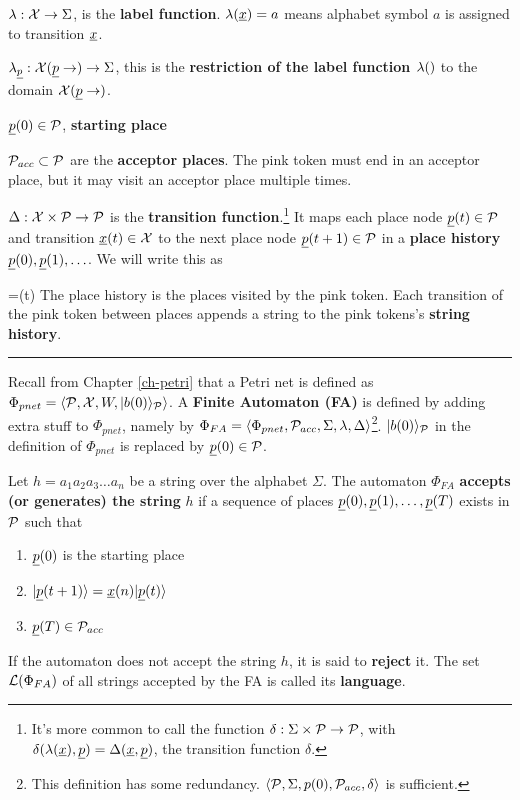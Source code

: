 $\lambda:{\cal X}\rightarrow\Sigma$, is the {\bf label function}. $\lam(\rvx)=a$ means alphabet symbol $a$ is assigned to transition $\rvx$.  


$\lam_\rvp:\calx(\rvp\rarrow)\rarrow\Sigma$, this is the {\bf restriction of the label function $\lambda()$}
to the domain $\calx(\rvp\rarrow)$.


$\rvp(0)\in \calp$, {\bf starting place }



${\cal P}_{acc}\subset {\cal P}$ are the 
{\bf acceptor places}. The pink token must end in an acceptor place, but it may visit
an acceptor place multiple times.



$\Delta:{\cal X}\times{\cal P}\rightarrow {\cal P}$ is the 
{\bf transition function}.\footnote{It's more common to call the function $\delta:\Sigma\times{\cal P}\rightarrow {\cal P}$, with $\delta(\lam(\rvx), \rvp)=\Delta(\rvx, \rvp)$, 
the
transition function $\delta$.}
It maps each place node $\rvp(t)\in\calp$ and transition $\rvx(t)\in\calx$ to the next place node $\rvp(t+1)\in\calp$ in a {\bf place history} $\rvp(0), \rvp(1), \ldots$. We will write this as

\beq
{}=\rvx(t)
\eeq
The place history is the places visited by the pink token. Each transition of
the pink token  between places appends a string
to the pink tokens's {\bf string history}.




\hrule
Recall from Chapter \ref{ch-petri} that a Petri net is defined as $\Phi_{pnet} = \left\langle{\cal P}, {\cal X}, W,|b(0)\rangle_{\cal P}\right\rangle$.
A {\bf Finite Automaton (FA)}
is defined by adding extra stuff to
$\Phi_{pnet}$, namely by
$\Phi_{FA}=\left\langle\Phi_{pnet},{\cal P}_{acc}, \Sigma, \lambda, \Delta\right\rangle$\footnote{This definition has some redundancy.  
$\left\langle{\cal P}, \Sigma, p(0), {\cal P}_{acc}, \delta\right\rangle$
is sufficient.}.
$|b(0)\rangle_{\cal P}$ in the definition
of $\Phi_{pnet}$ is replaced by
$\rvp(0)\in\calp$.

Let $h=a_1a_2a_3\ldots a_n$ be a string
over the alphabet $\Sigma$.
The automaton $\Phi_{FA}$ {\bf accepts (or generates) the string} $h$
if a sequence of places $\rvp(0), \rvp(1), \ldots, \rvp(T)$ exists
in ${\cal P}$ such that 
\begin{enumerate}
\item $\rvp(0)$  is the starting place
\item $\ket{\rvp(t+1) }= \rvx(n)\ket{\rvp(t)}$
\item $\rvp(T)\in \calp_{acc}$
\end{enumerate}
If the automaton does not accept the string $h$,
it is said to {\bf reject} it. The set ${\cal L}(\Phi_{FA})$ of all strings 
accepted by the FA is called its {\bf language}.

